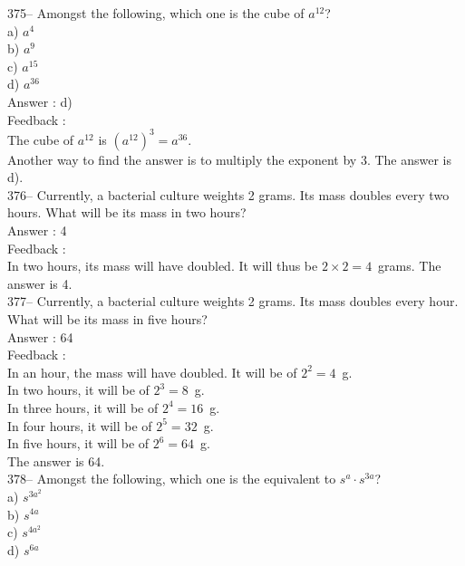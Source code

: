 \documentclass[letterpaper, 12pt]{article}
\begin{document}
375-- Amongst the following, which one is the cube of $a^{12}$?\\
a) $a^{4}$\\
b) $a^{9}$\\
c) $a^{15}$\\
d) $a^{36}$\\

Answer : d) \\

Feedback : \\
The cube of $a^{12}$ is $\left( a^{12}\right)^{3}=a^{36}$.  \\
Another way to find the answer is to multiply the exponent by 3.
The answer is d).\\

376-- Currently, a bacterial culture weights 2 grams.
Its mass doubles every two hours. What will be its mass in two hours?\\

Answer : 4\\

Feedback : \\
In two hours, its mass will have doubled. It will thus be $2\times
2=4$~grams.  The answer is 4.\\

377-- Currently, a bacterial culture weights 2 grams.
Its mass doubles every hour. What will be its mass in five hours?\\

Answer : 64\\

Feedback : \\
In an hour, the mass will have doubled. It will be of $2^{2}=4$~g.\\
In two hours, it will be of $2^{3}=8$~g.\\
In three hours, it will be of $2^{4}=16$~g.\\
In four hours, it will be of $2^{5}=32$~g.\\
In five hours, it will be of $2^{6}=64$~g.\\
The answer is 64.\\

378-- Amongst the following, which one is the equivalent to
$s^{a}\cdot s^{3a}$?\\
a) $s^{3a^{2}}$\\
b) $s^{4a}$\\
c) $s^{4a^{2}}$\\
d) $s^{6a}$\\
\end{document}
